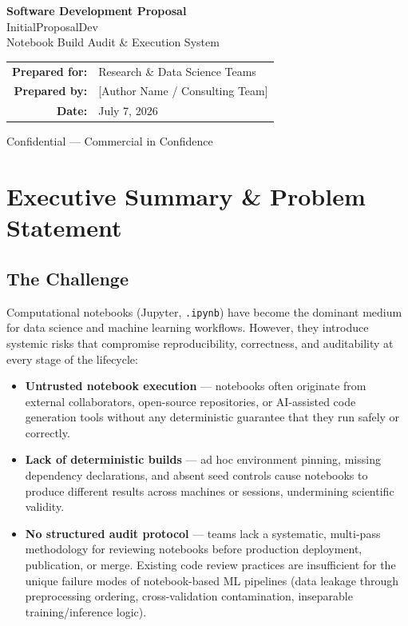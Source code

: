 \documentclass[11pt, a4paper]{article}
\begin{document}
\begin{center}
  \vspace*{2cm}
  {\Huge\bfseries Software Development Proposal}\\[0.5cm]
  {\LARGE InitialProposalDev}\\[0.3cm]
  {\large Notebook Build Audit \& Execution System}\\[2.5cm]

  \begin{tabular}{rl}
    \textbf{Prepared for:} & Research \& Data Science Teams \\
    \textbf{Prepared by:}  & [Author Name / Consulting Team] \\
    \textbf{Date:}         & July 7, 2026 \\
  \end{tabular}

  \vfill
  {\footnotesize\color{clrGray} Confidential — Commercial in Confidence}
  \vspace*{1cm}
\end{center}

\newpage

\section{Executive Summary \& Problem Statement}

\subsection*{The Challenge}

Computational notebooks (Jupyter, \texttt{.ipynb}) have become the dominant medium
for data science and machine learning workflows. However, they introduce systemic
risks that compromise reproducibility, correctness, and auditability at every stage
of the lifecycle:

\begin{itemize}
  \item \textbf{Untrusted notebook execution} — notebooks often originate from external
    collaborators, open-source repositories, or AI-assisted code generation tools
    without any deterministic guarantee that they run safely or correctly.

  \item \textbf{Lack of deterministic builds} — ad hoc environment pinning, missing
    dependency declarations, and absent seed controls cause notebooks to produce
    different results across machines or sessions, undermining scientific validity.

  \item \textbf{No structured audit protocol} — teams lack a systematic, multi-pass
    methodology for reviewing notebooks before production deployment, publication,
    or merge. Existing code review practices are insufficient for the unique failure
    modes of notebook-based ML pipelines (data leakage through preprocessing ordering,
    cross-validation contamination, inseparable training/inference logic).
\end{itemize}
\end{document}
